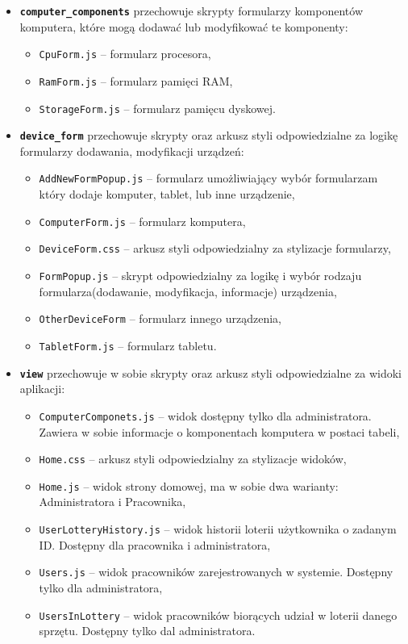 \begin {itemize}
\item \texttt{\textbf{computer\_components}} przechowuje skrypty formularzy komponentów komputera, które mogą dodawać lub modyfikować te komponenty:
	\begin{itemize}
	\item \texttt{CpuForm.js} -- formularz procesora,
	\item \texttt{RamForm.js} -- formularz pamięci RAM,
	\item \texttt{StorageForm.js} -- formularz pamięcu dyskowej.
	\end{itemize}
\item \texttt{\textbf{device\_form}} przechowuje skrypty oraz arkusz styli odpowiedzialne za logikę formularzy dodawania, modyfikacji urządzeń:
	\begin{itemize}
	\item \texttt{AddNewFormPopup.js} -- formularz umożliwiający wybór formularzam który dodaje komputer, tablet, lub inne urządzenie,
	\item \texttt{ComputerForm.js} -- formularz komputera,
	\item \texttt{DeviceForm.css} -- arkusz styli odpowiedzialny za stylizacje formularzy,
	\item \texttt{FormPopup.js} -- skrypt odpowiedzialny za logikę i wybór rodzaju formularza(dodawanie, modyfikacja, informacje) urządzenia,
	\item \texttt{OtherDeviceForm} -- formularz innego urządzenia,
	\item \texttt{TabletForm.js} -- formularz tabletu.
	\end{itemize}
\item \texttt{\textbf{view}} przechowuje w sobie skrypty oraz arkusz styli odpowiedzialne za widoki aplikacji:
	\begin{itemize}
	\item \texttt{ComputerComponets.js} -- widok dostępny tylko dla administratora. Zawiera w sobie informacje o komponentach komputera w postaci tabeli,
	\item \texttt{Home.css} -- arkusz styli odpowiedzialny za stylizacje widoków,
	\item \texttt{Home.js} -- widok strony domowej, ma w sobie dwa warianty: Administratora i Pracownika,
	\item \texttt{UserLotteryHistory.js} -- widok historii loterii użytkownika o zadanym ID. Dostępny dla pracownika i administratora,
	\item \texttt{Users.js} -- widok pracowników zarejestrowanych w systemie. Dostępny tylko dla administratora,
	\item \texttt{UsersInLottery} -- widok pracowników biorących udział w loterii danego sprzętu. Dostępny tylko dal administratora.
	\end{itemize}
\end{itemize}

